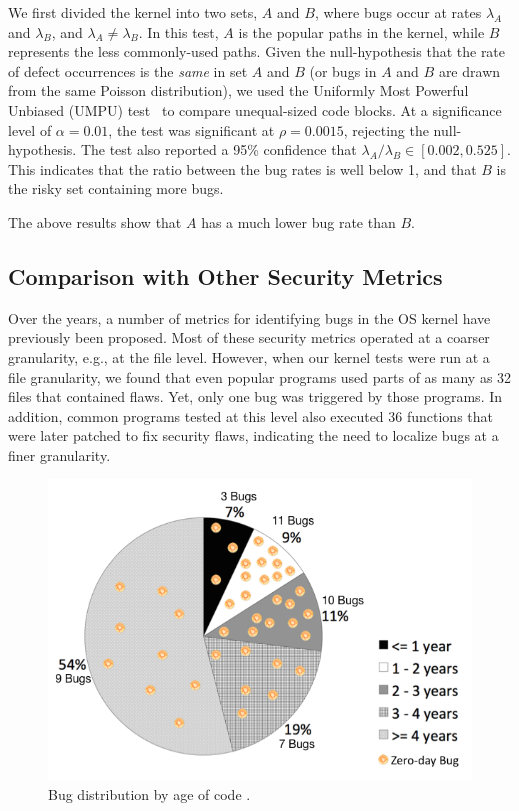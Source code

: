 We first divided the kernel into two sets,
$A$ and $B$, where bugs occur at rates $\lambda_A$ and
$\lambda_B$, and $\lambda_A \neq \lambda_B$. In this test, $A$ is the popular
paths in the kernel, while $B$
represents the less commonly-used paths. Given the null-hypothesis
that the rate of defect occurrences is the \textit{same} in set $A$ and $B$
(or bugs in $A$ and $B$ are drawn from the same Poisson distribution),
we used the Uniformly Most Powerful Unbiased (UMPU) test~\cite{shiue1982experiment}
to compare unequal-sized code blocks.
At a significance level of $\alpha=0.01$, the test was significant at
$\rho=0.0015$, rejecting the null-hypothesis.
The test also reported a 95\% confidence that $\lambda_A / \lambda_B
\in [0.002, 0.525]$. This indicates that the ratio between the bug rates is well
below 1, and that $B$ is the risky set containing more bugs. 

The above results show that
$A$ has a much lower bug rate than $B$.

\subsection{Comparison with Other Security Metrics}

Over the years, a number of metrics for identifying bugs in the OS kernel have
previously been proposed. Most of these security metrics operated at a coarser granularity,
e.g., at the file level. However, when our kernel tests were run at a file
granularity, we found that even popular programs used parts of as many as
32 files that contained flaws. Yet, only one bug was triggered by those programs.
In addition, common programs tested at this level also executed 36 functions
that were later patched to fix security
flaws, indicating the need to localize bugs at a finer granularity.

\begin{figure}
\centering
\includegraphics[width=1.0\columnwidth]{diagram/metrics_age.png}
\caption{\small Bug distribution by age of code \cite{ozment2006milk}.}
\label{fig:metrics_age}
\end{figure}

